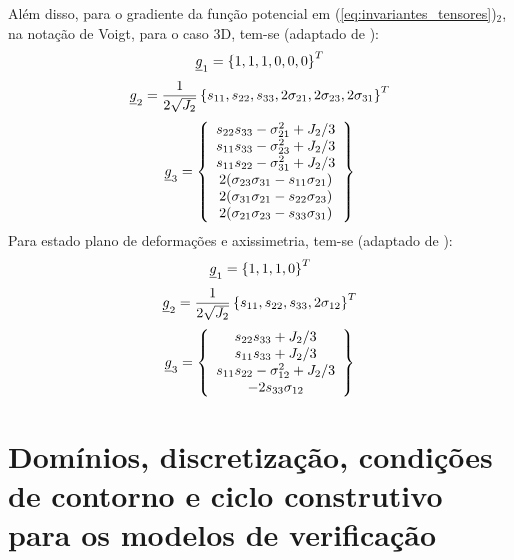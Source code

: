 Além disso, para o gradiente da função potencial em (\ref{eq:invariantes_tensores})$_2$, na notação de Voigt, para o caso 3D, tem-se (adaptado de ):
\begin{equation}
	\label{eq:g1_3D}
	\underline{g}_1 = \left\{1,1,1,0,0,0\right\}^T
\end{equation}
\begin{equation}
	\label{eq:g2_3D}
	\underline{g}_2 = \dfrac{1}{2\sqrt{J_2}} \left\{s_{11},s_{22},s_{33},2\sigma_{21},2\sigma_{23},2\sigma_{31}\right\}^T
\end{equation}
\begin{equation}
	\label{eq:g3_3D}
	\underline{g}_3 = \left\{
	\begin{array}{ccc}
	s_{22}s_{33}-\sigma_{21}^2 + J_2/3 \\
	s_{11}s_{33}-\sigma_{23}^2 + J_2/3 \\	
	s_{11}s_{22}-\sigma_{31}^2 + J_2/3 \\
	2(\sigma_{23}\sigma_{31}-s_{11}\sigma_{21}) \\
	2(\sigma_{31}\sigma_{21}-s_{22}\sigma_{23}) \\
	2(\sigma_{21}\sigma_{23}-s_{33}\sigma_{31})
	\end{array} \right\}
\end{equation}
Para estado plano de deformações e axissimetria, tem-se (adaptado de ):
\begin{equation}
	\label{eq:g1_2D}
	\underline{g}_1 = \left\{1,1,1,0\right\}^T
\end{equation}
\begin{equation}
	\label{eq:g2_2D}
	\underline{g}_2 = \dfrac{1}{2\sqrt{J_2}} \left\{s_{11},s_{22},s_{33},2\sigma_{12}\right\}^T
\end{equation}
\begin{equation}
	\label{eq:g3_2D}
	\underline{g}_3 = \left\{
	\begin{array}{ccc}
		s_{22}s_{33} + J_2/3 \\
		s_{11}s_{33} + J_2/3 \\	
		s_{11}s_{22}-\sigma_{12}^2 + J_2/3 \\
		- 2s_{33}\sigma_{12}
	\end{array} \right\}
\end{equation}

\section{Domínios, discretização, condições de contorno e ciclo construtivo para os modelos de verificação}


